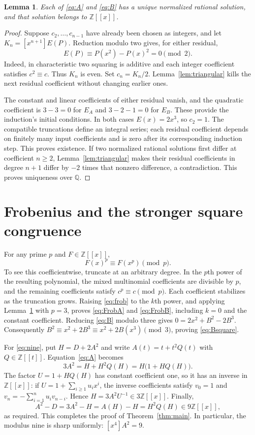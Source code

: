 \documentclass[11pt]{article}
\newtheorem{lemma}[theorem]{Lemma}
\newcommand{\Z}{\mathbb Z}
\newcommand{\Q}{\mathbb Q}
\newcommand{\coef}[1]{[x^{#1}]}
\begin{document}
\begin{lemma}\label{lem:integer}
Each of \eqref{eq:A} and \eqref{eq:B} has a unique normalized rational
solution, and that solution belongs to $\Z[[x]]$.
\end{lemma}
\begin{proof}
Suppose $c_2,\ldots,c_{n-1}$ have already been chosen as integers, and
let $K_n=\coef{n+1}E(P)$. Reduction modulo two gives, for either residual,
\[
 E(P)\equiv P(x^2)-P(x)^2=0\pmod2.
\]
Indeed, in characteristic two squaring is additive and each integer
coefficient satisfies $c^2\equiv c$. Thus $K_n$ is even.
Set $c_n=K_n/2$. Lemma~\ref{lem:triangular} kills the next residual
coefficient without changing earlier ones.

The constant and linear coefficients of either residual vanish, and
the quadratic coefficient is $3-3=0$ for $E_A$ and $3-2-1=0$ for $E_B$.
These provide the induction's initial conditions. In both cases
$E(x)=2x^3$, so $c_2=1$. The compatible truncations define an integral
series; each residual coefficient depends on finitely many input
coefficients and is zero after its corresponding induction step.
This proves existence. If two normalized rational solutions first differ
at coefficient $n\geq2$, Lemma~\ref{lem:triangular} makes their residual
coefficients in degree $n+1$ differ by $-2$ times that nonzero difference,
a contradiction. This proves uniqueness over $\Q$.
\end{proof}

\section{Frobenius and the stronger square congruence}
For any prime $p$ and $F\in\Z[[x]]$,
\begin{equation}\label{eq:frob}
 F(x)^p\equiv F(x^p)\pmod p.
\end{equation}
To see this coefficientwise, truncate at an arbitrary degree. In the
$p$th power of the resulting polynomial, the mixed multinomial
coefficients are divisible by $p$, and the remaining coefficients satisfy
$c^p\equiv c\pmod p$. Each coefficient stabilizes as the truncation grows.
Raising \eqref{eq:frob} to the $k$th power, and applying
Lemma~\ref{lem:integer} with $p=3$, proves \eqref{eq:FrobA} and
\eqref{eq:FrobB}, including $k=0$ and the constant coefficient.
Reducing \eqref{eq:B} modulo three gives
$0=2x^2+B^2-2B^3$. Consequently
$B^2\equiv x^2+2B^3\equiv x^2+2B(x^3)\pmod3$, proving
\eqref{eq:Bsquare}.

For \eqref{eq:nine}, put $H=D+2A^2$ and write
$A(t)=t+t^2Q(t)$ with $Q\in\Z[[t]]$. Equation~\eqref{eq:A} becomes
\[
 3A^2=H+H^2Q(H)=H\bigl(1+HQ(H)\bigr).
\]
The factor $U=1+HQ(H)$ has constant coefficient one, so it has an
inverse in $\Z[[x]]$: if $U=1+\sum_{i\geq1}u_ix^i$, the inverse
coefficients satisfy $v_0=1$ and
$v_n=-\sum_{i=1}^n u_i v_{n-i}$.
Hence $H=3A^2U^{-1}\in3\Z[[x]]$. Finally,
\[
 A^2-D=3A^2-H=A(H)-H=H^2Q(H)\in9\Z[[x]],
\]
as required. This completes the proof of Theorem~\ref{thm:main}.
In particular, the modulus nine is sharp uniformly: $\coef4 A^2=9$.
\end{document}
